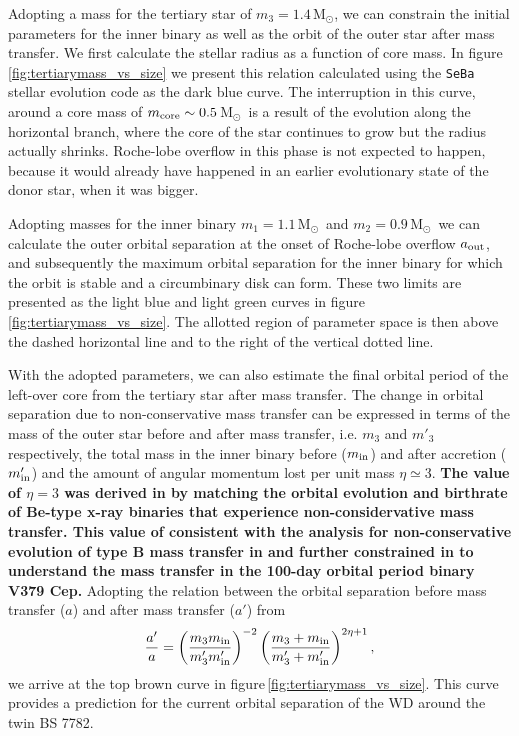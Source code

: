 \documentclass[twocolumn]{aastex62}
\newcommand{\MSun}{\mbox{M$_\odot$}}
\begin{document}
Adopting a mass for the tertiary star of $m_3 = 1.4$\,\MSun, we can
constrain the initial parameters for the inner binary as well as the
orbit of the outer star after mass transfer. We first calculate the
stellar radius as a function of core mass. In
figure\,\ref{fig:tertiarymass_vs_size} we present this relation
calculated using the {\tt SeBa} stellar evolution code
\citep{1996A&A...309..179P} as the dark blue curve.  The interruption
in this curve, around a core mass of $m_{\rm core} \sim 0.5$\,\MSun\,
is a result of the evolution along the horizontal branch, where the
core of the star continues to grow but the radius actually shrinks.
Roche-lobe overflow in this phase is not expected to happen, because
it would already have happened in an earlier evolutionary state of the
donor star, when it was bigger.

Adopting masses for the inner binary $m_1=1.1$\,\MSun\, and
$m_2=0.9$\,\MSun\, we can calculate the outer orbital separation at
the onset of Roche-lobe overflow $a_{\rm out}$, and subsequently the
maximum orbital separation for the inner binary for which the orbit is
stable and a circumbinary disk can form. These two limits are
presented as the light blue and light green curves in
figure\,\ref{fig:tertiarymass_vs_size}.  The allotted region of
parameter space is then above the dashed horizontal line and to the
right of the vertical dotted line.

With the adopted parameters, we can also estimate the final orbital
period of the left-over core from the tertiary star after mass
transfer.  The change in orbital separation due to non-conservative
mass transfer can be expressed in terms of the mass of the outer star
before and after mass transfer, i.e. $m_3$ and $m'_3$ respectively,
the total mass in the inner binary before ($m_{\rm in}$) and after
accretion ($m'_{\rm in}$) and the amount of angular momentum lost per
unit mass $\eta \simeq 3$.  {\bf The value of $\eta = 3$ was derived
  in \cite{1991A&A...241..419P,1995A&A...296..691P} by matching the
  orbital evolution and birthrate of Be-type x-ray binaries that
  experience non-considervative mass transfer. This value of
  consistent with the analysis for non-conservative evolution of type
  B mass transfer in \cite{2011A&A...527A..84K} and further
  constrained in \cite{2007ASPC..367..387P} to understand the mass
  transfer in the 100-day orbital period binary V379 Cep.}  Adopting
the relation between the orbital separation before mass transfer ($a$)
and after mass transfer ($a'$) from \cite{1995A&A...296..691P}
\begin{equation}
  {a' \over a} = \left( {m_3 m_{\rm in} \over m'_3 m'_{\rm in}} \right)^{-2}
  \left( {m_3 + m_{\rm in} \over m'_3 + m'_{\rm in}} \right)^{2\eta + 1},
\end{equation}
we arrive at the top brown curve in
figure\,\ref{fig:tertiarymass_vs_size}. This curve provides a prediction for 
the current orbital separation of the WD around the twin
BS 7782.
\end{document}
